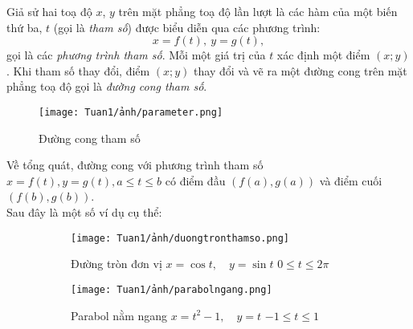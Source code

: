 \begin{definition}
    Giả sử hai toạ độ $x$, $y$ trên mặt phẳng toạ độ lần lượt là các hàm của một biến thứ ba, $t$ (gọi là \emph{tham số}) được biểu diễn qua các phương trình:
     \begin{equation*}   x=f(t),\ y=g(t),
\end{equation*}
    gọi là các \emph{phương trình tham số}. Mỗi một giá trị của $t$ xác định một điểm $(x;y)$. Khi tham số thay đổi, điểm $(x;y)$ thay đổi và vẽ ra một đường cong trên mặt phẳng toạ độ gọi là \emph{đường cong tham số}.
\end{definition}



\begin{figure}[H]
    \centering
    \texttt{[image: Tuan1/ảnh/parameter.png]}
    \caption{Đường cong tham số}\label{fig:phuongtrinhthamso}
\end{figure}    
\vspace{-0.5em}
Về tổng quát, đường cong với phương trình tham số $x=f(t), y=g(t), a\leq t\leq b$ có điểm đầu $(f(a),g(a))$ và điểm cuối $(f(b),g(b))$.\\ Sau đây là một số ví dụ cụ thể:
\vspace{-1.75em}
\begin{figure}[H]
    \centering
    \begin{subfigure}{0.45\textwidth}
        \texttt{[image: Tuan1/ảnh/duongtronthamso.png]}
        \caption{ Đường tròn đơn vị \newline\hspace*{1em} \(x=\cos t,\quad y=\sin t\)\newline \hspace*{1em} \(0\leq t\leq 2\pi\)}
    \end{subfigure}
    \hspace{\fill}
    \begin{subfigure}{0.45\textwidth}
        \texttt{[image: Tuan1/ảnh/parabolngang.png]}
        \caption{Parabol nằm ngang \newline\hspace*{1em}\(x=t^2 -1,\quad y=t\)\newline\hspace*{1em} \(-1\leq t\leq 1\)}
    \end{subfigure}
    \caption{}
\end{figure}

